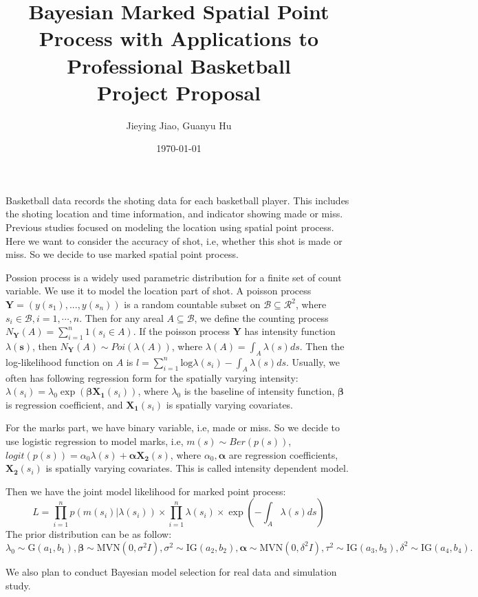 \documentclass{article}
\title{Bayesian Marked Spatial Point Process with Applications to
  Professional Basketball \\
\large Project Proposal}
\author{Jieying Jiao, Guanyu Hu}
\date{\today}
\begin{document}
\maketitle

Basketball data records the shoting data for each basketball
player. This includes the shoting location and time information, and
indicator showing made or miss. Previous studies focused on modeling
the location using spatial point process. Here we want to consider the 
accuracy of shot, i.e, whether this shot is made or miss. So we decide
to use marked spatial point process.


Possion process is a widely used parametric distribution for a finite
set of count variable. We use it to model the location part of shot. A
poisson process $\bm{Y} = (y(s_1),...,y(s_n))$ is a random countable subset
on $\mathcal{B} \subseteq \mathcal{R}^2$, where $s_i \in \mathcal{B},
i=1,\cdots,n$. Then for any areal $A\subseteq\mathcal{B}$, we define
the counting process $N_{\bm{Y}}(A)=\sum_{i=1}^n 1(s_i\in A)$. If the
poisson process $\bm{Y}$ has intensity function $\lambda(\bm{s})$,
then $N_{\bm{Y}}(A)\sim Poi(\lambda(A))$, where
$\lambda(A)=\int_A\lambda(s)ds$. Then the log-likelihood function on
$A$ is 	$l=\sum_{i=1}^n \text{log}\lambda(s_i)-\int_A \lambda(s)
ds$. Usually, we often has following regression form for the spatially
varying intensity:
$\lambda(s_i)=\lambda_0\exp(\bm{\beta}\bm{X_1}(s_i))$, where $\lambda_0$
is the baseline of intensity function, $\bm{\beta}$ is regression
coefficient, and $\bm{X_1}(s_i)$ is spatially varying covariates. 


For the marks part, we have binary variable, i.e, made or miss. So we
decide to use logistic regression to model marks, i.e, $m(s) \sim
Ber(p(s))$, $logit(p(s))=\alpha_0\lambda(s)+\bm{\alpha}\bm{X_2}(s)$,
where $\alpha_0, \bm{\alpha}$ are regression coefficients,
$\bm{X_2}(s_i)$ is spatially varying covariates. This is called
intensity dependent model.

Then we have the joint model likelihood for marked point process:
$$L =\prod_{i=1}^n p(m(s_i)|\lambda(s_i))\times
                \prod_{i=1}^n \lambda(s_i)\times \exp\left(-\int_A
                  \lambda(s)ds\right)$$
The prior distribution can be as follow: $\lambda_0 \sim
\text{G}(a_1,b_1), \bm{\beta} \sim \text{MVN}(0,\sigma^2I), \sigma^2
\sim \text{IG}(a_2,b_2), \bm{\alpha} \sim \text{MVN}(0,\delta^2I),
\tau^2 \sim \text{IG}(a_3,b_3), \delta^2 \sim \text{IG}(a_4,b_4).$


We also plan to conduct Bayesian model selection for real data and
simulation study.
\end{document}
